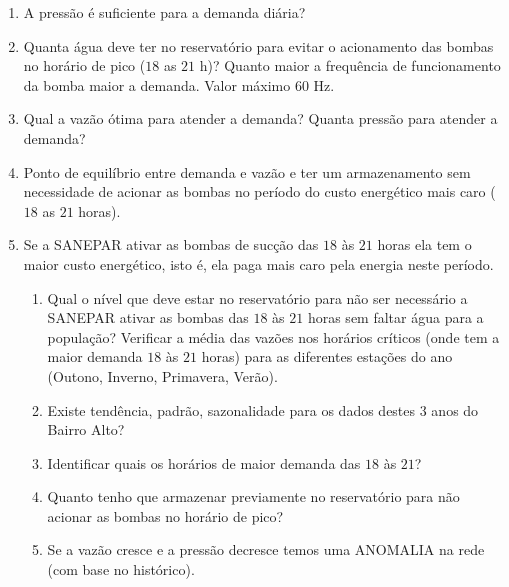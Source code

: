 \begin{enumerate}[start=1, label={\textbf{Q} \arabic*}]
	\item \label{q1}  A pressão é suficiente para a demanda diária? 
	\item \label{q2} Quanta água deve ter no reservatório para evitar o acionamento das bombas no horário de pico ($18$ as $21$ h)? Quanto maior a frequência de funcionamento da bomba maior a demanda. Valor máximo $ 60 $ Hz. 
	\item \label{q3} Qual a vazão ótima para atender a demanda? Quanta pressão para atender a demanda? 
	\item \label{q4} Ponto de equilíbrio entre demanda e vazão e ter um armazenamento sem necessidade de acionar as bombas no período do custo energético mais caro ($18$ as $21$ horas).
	\item \label{q5} Se a SANEPAR ativar as bombas de sucção das $18$ às $21$ horas ela tem o maior custo energético, isto é, ela paga mais caro pela energia neste período.
	
	 
	\begin{enumerate}[label=\alph*.]
	\item \label{q5:a} Qual o nível que deve estar no reservatório para não ser necessário a SANEPAR ativar as bombas das $18$ às $21$ horas sem faltar água para a população?
	Verificar a média das vazões nos horários críticos (onde tem a maior demanda $18$ às $21$ horas) para as diferentes estações do ano (Outono, Inverno, Primavera, Verão). 
	\item \label{q5:b} Existe tendência, padrão, sazonalidade para os dados destes 3 anos do Bairro Alto?
	\item \label{q5:c}Identificar quais os horários de maior demanda das $18$ às $21$?
	\item \label{q5:d} Quanto tenho que armazenar previamente no reservatório para não acionar as bombas no horário de pico?
	\item \label{q5:e} Se a vazão cresce e a pressão decresce temos uma ANOMALIA na rede (com base no histórico).	
	\end{enumerate}
\end{enumerate}
